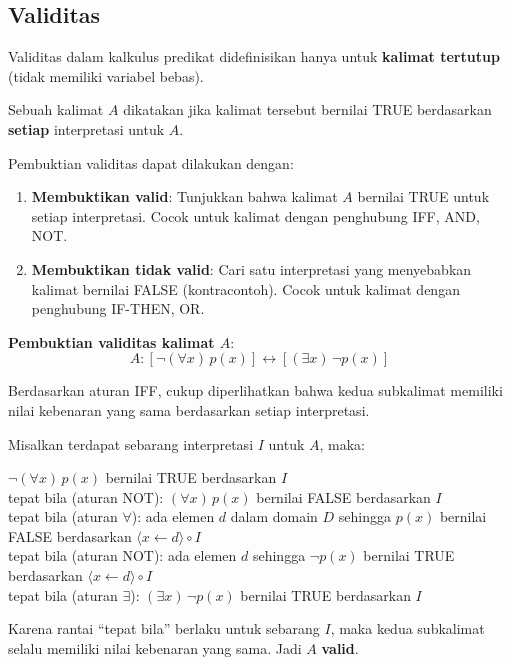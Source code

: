 \subsection{Validitas}

\begin{konsep}
Validitas dalam kalkulus predikat didefinisikan hanya untuk \textbf{kalimat tertutup} (tidak memiliki variabel bebas).

Sebuah kalimat $A$ dikatakan  jika kalimat tersebut bernilai TRUE berdasarkan \textbf{setiap} interpretasi untuk $A$.

Pembuktian validitas dapat dilakukan dengan:
\begin{enumerate}
  \item \textbf{Membuktikan valid}: Tunjukkan bahwa kalimat $A$ bernilai TRUE untuk setiap interpretasi. Cocok untuk kalimat dengan penghubung IFF, AND, NOT.
  \item \textbf{Membuktikan tidak valid}: Cari satu interpretasi yang menyebabkan kalimat bernilai FALSE (kontracontoh). Cocok untuk kalimat dengan penghubung IF-THEN, OR.
\end{enumerate}
\end{konsep}

\begin{contoh}
\textbf{Pembuktian validitas kalimat $A$}:
$$A : [\neg(\forall x)\, p(x)] \leftrightarrow [(\exists x)\, \neg p(x)]$$

Berdasarkan aturan IFF, cukup diperlihatkan bahwa kedua subkalimat memiliki nilai kebenaran yang sama berdasarkan setiap interpretasi.

Misalkan terdapat sebarang interpretasi $I$ untuk $A$, maka:

$\neg(\forall x)\, p(x)$ bernilai TRUE berdasarkan $I$\\
\hspace*{5mm} tepat bila (aturan NOT): $(\forall x)\, p(x)$ bernilai FALSE berdasarkan $I$\\
\hspace*{5mm} tepat bila (aturan $\forall$): ada elemen $d$ dalam domain $D$ sehingga $p(x)$ bernilai FALSE berdasarkan $\langle x \leftarrow d \rangle \circ I$\\
\hspace*{5mm} tepat bila (aturan NOT): ada elemen $d$ sehingga $\neg p(x)$ bernilai TRUE berdasarkan $\langle x \leftarrow d \rangle \circ I$\\
\hspace*{5mm} tepat bila (aturan $\exists$): $(\exists x)\, \neg p(x)$ bernilai TRUE berdasarkan $I$

Karena rantai ``tepat bila'' berlaku untuk sebarang $I$, maka kedua subkalimat selalu memiliki nilai kebenaran yang sama. Jadi $A$ \textbf{valid}.
\end{contoh}

